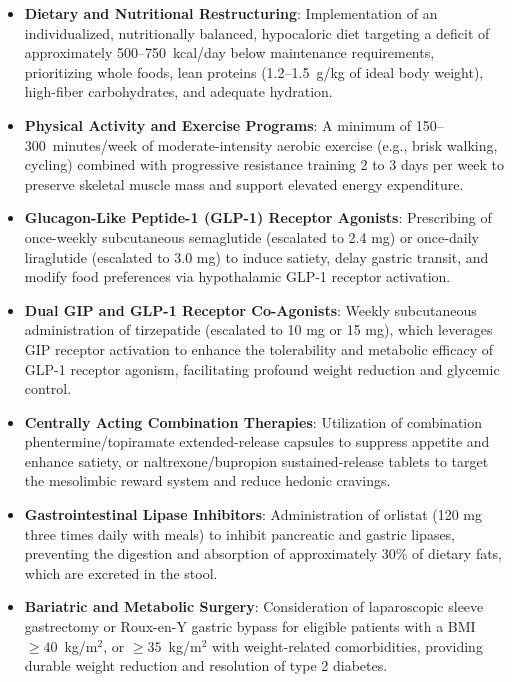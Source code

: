 \begin{itemize}
\item \textbf{Dietary and Nutritional Restructuring}: Implementation of an individualized, nutritionally balanced, hypocaloric diet targeting a deficit of approximately 500--750~kcal/day below maintenance requirements, prioritizing whole foods, lean proteins (1.2--1.5~g/kg of ideal body weight), high-fiber carbohydrates, and adequate hydration.
\item \textbf{Physical Activity and Exercise Programs}: A minimum of 150--300~minutes/week of moderate-intensity aerobic exercise (e.g., brisk walking, cycling) combined with progressive resistance training 2 to 3 days per week to preserve skeletal muscle mass and support elevated energy expenditure.
\item \textbf{Glucagon-Like Peptide-1 (GLP-1) Receptor Agonists}: Prescribing of once-weekly subcutaneous semaglutide (escalated to 2.4 mg) or once-daily liraglutide (escalated to 3.0 mg) to induce satiety, delay gastric transit, and modify food preferences via hypothalamic GLP-1 receptor activation.
\item \textbf{Dual GIP and GLP-1 Receptor Co-Agonists}: Weekly subcutaneous administration of tirzepatide (escalated to 10 mg or 15 mg), which leverages GIP receptor activation to enhance the tolerability and metabolic efficacy of GLP-1 receptor agonism, facilitating profound weight reduction and glycemic control.
\item \textbf{Centrally Acting Combination Therapies}: Utilization of combination phentermine/topiramate extended-release capsules to suppress appetite and enhance satiety, or naltrexone/bupropion sustained-release tablets to target the mesolimbic reward system and reduce hedonic cravings.
\item \textbf{Gastrointestinal Lipase Inhibitors}: Administration of orlistat (120 mg three times daily with meals) to inhibit pancreatic and gastric lipases, preventing the digestion and absorption of approximately 30\% of dietary fats, which are excreted in the stool.
\item \textbf{Bariatric and Metabolic Surgery}: Consideration of laparoscopic sleeve gastrectomy or Roux-en-Y gastric bypass for eligible patients with a BMI $\ge 40$~kg/m$^2$, or $\ge 35$~kg/m$^2$ with weight-related comorbidities, providing durable weight reduction and resolution of type 2 diabetes.
\end{itemize}

